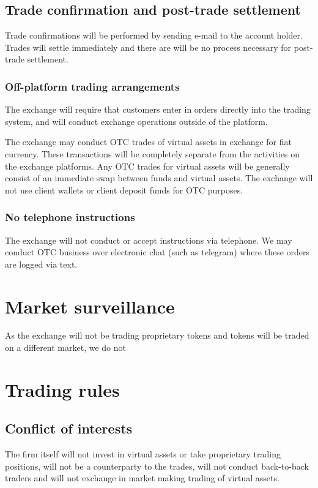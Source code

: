 \subsection{Trade confirmation and post-trade settlement}

Trade confirmations will be performed by sending e-mail to the account
holder.  Trades will settle immediately and there are will be no
process necessary for post-trade settlement.

\subsubsection{Off-platform trading arrangements}
The exchange will require that customers enter in orders directly into
the trading system, and will conduct exchange operations outside of
the platform.

The exchange may conduct OTC trades of virtual assets in exchange for
fiat currency.  These transactions will be completely separate from
the activities on the exchange platforms.  Any OTC trades for virtual
assets will be generally consist of an immediate swap between funds
and virtual assets.  The exchange will not use client wallets or
client deposit funds for OTC purposes.

\subsubsection{No telephone instructions}
The exchange will not conduct or accept instructions via telephone.
We may conduct OTC business over electronic chat (such as telegram) where
these orders are logged via text.

\section{Market surveillance}

As the exchange will not be trading proprietary tokens and tokens will
be traded on a different market, we do not 


\section{Trading rules}

\subsection{Conflict of interests}
The firm itself will not invest in virtual assets or take proprietary
trading positions, will not be a counterparty to the trades, will not
conduct back-to-back traders and will not exchange in market making
trading of virtual assets.


